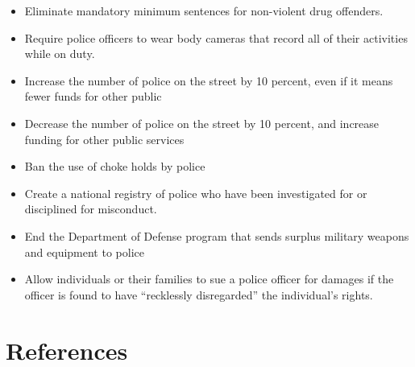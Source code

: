 \documentclass[
  12pt,
]{article}
\begin{document}
\begin{itemize}
\item
  Eliminate mandatory minimum sentences for non-violent drug offenders.
\item
  Require police officers to wear body cameras that record all of their activities while on duty.
\item
  Increase the number of police on the street by 10 percent, even if it means fewer funds for other public
\item
  Decrease the number of police on the street by 10 percent, and increase funding for other public services
\item
  Ban the use of choke holds by police
\item
  Create a national registry of police who have been investigated for or disciplined for misconduct.
\item
  End the Department of Defense program that sends surplus military weapons and equipment to police
\item
  Allow individuals or their families to sue a police officer for damages if the officer is found to have ``recklessly disregarded'' the individual's rights.
\end{itemize}

\newpage

\hypertarget{references}{%
\section*{References}\label{references}}
\end{document}

